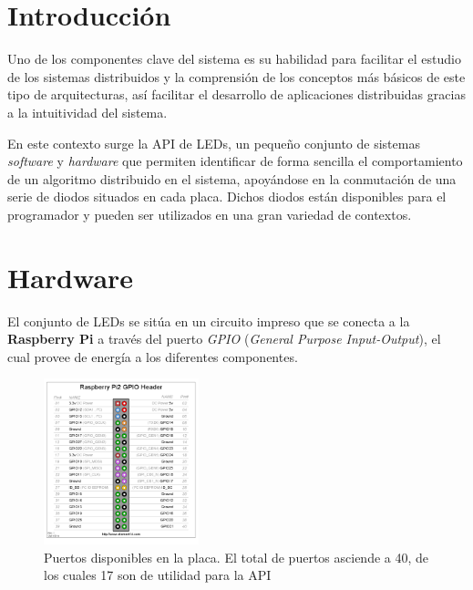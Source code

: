 \documentclass{article}
\title{\hmwkTitle}
\author{\textbf{\hmwkAuthorName}}
\date{\hmwkDueDate}
\begin{document}
\maketitle


\setcounter{tocdepth}{1}

\newpage
\tableofcontents
\newpage

\section{Introducción}

Uno de los componentes clave del sistema es su habilidad para facilitar el estudio de los sistemas distribuidos y la comprensión de los conceptos más básicos de este tipo de arquitecturas, así facilitar el desarrollo de aplicaciones distribuidas gracias a la intuitividad del sistema.

En este contexto surge la API de LEDs, un pequeño conjunto de sistemas \textit{software} y \textit{hardware} que permiten identificar de forma sencilla el comportamiento de un algoritmo distribuido en el sistema, apoyándose en la conmutación de una serie de diodos situados en cada placa. Dichos diodos están disponibles para el programador y pueden ser utilizados en una gran variedad de contextos.

\section{Hardware}

El conjunto de LEDs se sitúa en un circuito impreso que se conecta a la \textbf{Raspberry Pi} a través del puerto \textit{GPIO} (\textit{General Purpose Input-Output}), el cual provee de energía a los diferentes componentes.

\begin{figure}[H]
\centering
\includegraphics[width=0.4\textwidth]{GPIO_Pi2}
\caption{Puertos disponibles en la placa. El total de puertos asciende a 40, de los cuales 17 son de utilidad para la API}
\label{pi:gpio}
\end{figure}
\end{document}
